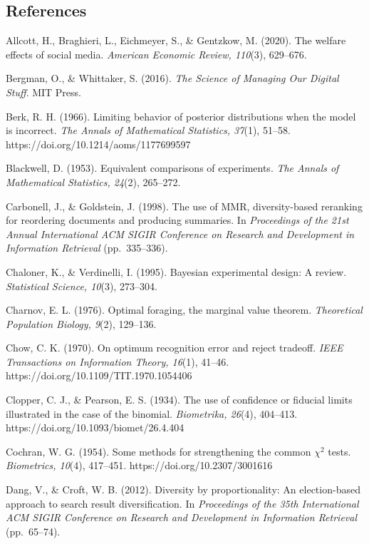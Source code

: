 \documentclass[
  11pt]{article}
\begin{document}
\subsection{References}\label{references}

\begingroup\footnotesize

Allcott, H., Braghieri, L., Eichmeyer, S., \& Gentzkow, M. (2020). The
welfare effects of social media. \emph{American Economic Review,
110}(3), 629--676.

Bergman, O., \& Whittaker, S. (2016). \emph{The Science of Managing Our
Digital Stuff}. MIT Press.

Berk, R. H. (1966). Limiting behavior of posterior distributions when
the model is incorrect. \emph{The Annals of Mathematical Statistics,
37}(1), 51--58. https://doi.org/10.1214/aoms/1177699597

Blackwell, D. (1953). Equivalent comparisons of experiments. \emph{The
Annals of Mathematical Statistics, 24}(2), 265--272.

Carbonell, J., \& Goldstein, J. (1998). The use of MMR, diversity-based
reranking for reordering documents and producing summaries. In
\emph{Proceedings of the 21st Annual International ACM SIGIR Conference
on Research and Development in Information Retrieval} (pp.~335--336).

Chaloner, K., \& Verdinelli, I. (1995). Bayesian experimental design: A
review. \emph{Statistical Science, 10}(3), 273--304.

Charnov, E. L. (1976). Optimal foraging, the marginal value theorem.
\emph{Theoretical Population Biology, 9}(2), 129--136.

Chow, C. K. (1970). On optimum recognition error and reject tradeoff.
\emph{IEEE Transactions on Information Theory, 16}(1), 41--46.
https://doi.org/10.1109/TIT.1970.1054406

Clopper, C. J., \& Pearson, E. S. (1934). The use of confidence or
fiducial limits illustrated in the case of the binomial.
\emph{Biometrika, 26}(4), 404--413.
https://doi.org/10.1093/biomet/26.4.404

Cochran, W. G. (1954). Some methods for strengthening the common
\(\chi^2\) tests. \emph{Biometrics, 10}(4), 417--451.
https://doi.org/10.2307/3001616

Dang, V., \& Croft, W. B. (2012). Diversity by proportionality: An
election-based approach to search result diversification. In
\emph{Proceedings of the 35th International ACM SIGIR Conference on
Research and Development in Information Retrieval} (pp.~65--74).
\end{document}
